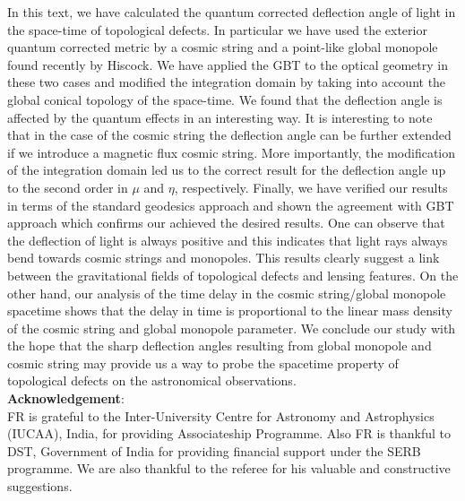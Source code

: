 \documentclass[preprint,superscriptaddress,amsfonts,amssymb,amsmath,showpacs]{revtex4}
\begin{document}
In this text, we have calculated the quantum corrected deflection angle of light in the space-time of topological defects. In particular we have used the exterior quantum corrected metric by a cosmic string and a point-like global monopole found recently by Hiscock. We have applied the GBT to the optical geometry in these two cases and modified the integration domain by taking into account the global conical topology of the space-time. We found that the deflection angle is affected by the quantum effects in an interesting way. It is interesting to note that in the case of the cosmic string the deflection angle can be further extended if we introduce a magnetic flux cosmic string. More importantly, the modification of the integration domain 
led us to the correct result for the deflection angle up to the second order in $\mu$ and $\eta$, respectively. Finally, we have verified our results in terms of the standard geodesics approach and shown the agreement with GBT approach which confirms our achieved the desired results.   One can  observe that
the deflection of light is always positive and this indicates that light rays always bend towards cosmic strings and monopoles.
This results clearly suggest a link between the gravitational fields of topological defects 
and lensing features. On the other hand, our analysis of the time delay in the cosmic string/global monopole spacetime shows that the delay in time is proportional to the linear mass density of the  cosmic string and global monopole parameter. 
We conclude our study with the hope that the sharp  deflection angles  resulting from global monopole and cosmic string may provide us a way to probe the spacetime property of topological defects on the astronomical observations.  \\
\newpage
\textbf{Acknowledgement}: \\

FR   is grateful to the Inter-University Centre for Astronomy and Astrophysics
(IUCAA), India, for providing Associateship Programme.  Also FR is  thankful to DST, Government of India for providing financial support
under the SERB programme.  We are also thankful to the referee for his valuable and constructive suggestions.
\end{document}
